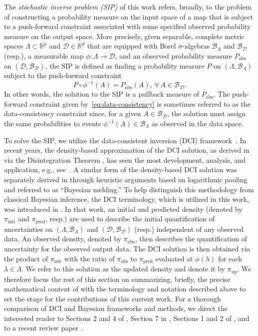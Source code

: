 \documentclass{article}
\newcommand{\pspace}{\Lambda}
\newcommand{\dspace}{\mathcal{D}}
\newcommand{\pborel}{\mathcal{B}_{\pspace}}
\newcommand{\dborel}{\mathcal{B}_{\dspace}}
\newcommand{\initdens}{\pi_{\text{init}}}
\newcommand{\updatedens}{\pi_{\text{up}}}
\newcommand{\predictdens}{\pi_\text{pred}}
\newcommand{\obsmeas}{P_{\text{obs}}}
\newcommand{\obsdens}{\pi_{\text{obs}}}
\begin{document}
The {\em stochastic inverse problem (SIP)} of this work refers, broadly, to the problem of constructing a probability measure on the input space of a map that is subject to a push-forward constraint associated with some specified observed probability measure on the output space. 
More precisely, given separable, complete metric spaces $\pspace\subset\mathbb{R}^p$ and $\dspace\in\mathbb{R}^d$ that are equipped with Borel $\sigma$-algebras $\pborel$ and $\dborel$ (resp.), a measurable map $\phi:\pspace\to\dspace$, and an observed probability measure $\obsmeas$ on $(\dspace,\dborel)$, the SIP is defined as finding a probability measure $P$ on $(\pspace,\pborel)$ subject to the push-forward constraint
\begin{equation}\label{eq:data-consistency}
    P\circ\phi^{-1}(A) = \obsmeas(A), \ \forall \, A\in\dborel.
\end{equation}
In other words, the solution to the SIP is a pullback measure of $\obsmeas$.
The push-forward constraint given by~\eqref{eq:data-consistency} is sometimes referred to as the data-consistency constraint since, for a given $A\in\dborel$, the solution must assign the same probabilities to events $\phi^{-1}(A)\in\pborel$ as observed in the data space. 

To solve the SIP, we utilize the data-consistent inversion (DCI) framework~\cite{BET+14, BJW18a, BBE24}.
In recent years, the density-based approximation of the DCI solution, as derived in \cite{BJW18a} via the Disintegration Theorem \cite{changandpollard1997}, has seen the most development, analysis, and application, e.g., see~\cite{ZM2023, RPK+23, MSB+22, tran2021solving, BGW2020, FBB25, BH20}.
A similar form of the density-based DCI solution was separately derived in \cite{PR2000} through heuristic arguments based on logarithmic pooling and referred to as ``Bayesian melding.'' 
To help distinguish this methodology from classical Bayesian inference, the DCI terminology, which is utilized in this work, was introduced in \cite{BJW18b}.
In that work, an initial and predicted density (denoted by $\initdens$ and $\predictdens$, resp.) are used to describe the initial quantification of uncertainties on $(\pspace,\pborel)$ and $(\dspace,\dborel)$ (resp.) independent of any observed data.
An observed density, denoted by $\obsdens$, then describes the quantification of uncertainty for the observed output data.
The DCI solution is then obtained via the product of $\initdens$ with the ratio of $\obsdens$ to $\predictdens$ evaluated at $\phi(\lambda)$ for each $\lambda\in\pspace$. 
We refer to this solution as the updated density and denote it by $\updatedens$.
We therefore focus the rest of this section on summarizing, briefly, the precise mathematical content of \cite{BJW18a} with the terminology and notation described above to set the stage for the contributions of this current work.
For a thorough comparison of DCI and Bayesian frameworks and methods, we direct the interested reader to Sections 2 and 4 of \cite{PCT+23}, Section 7 in \cite{BJW18a}, Sections 1 and 2 of \cite{BWY20}, and to a recent review paper \cite{BBE24}.
\end{document}
